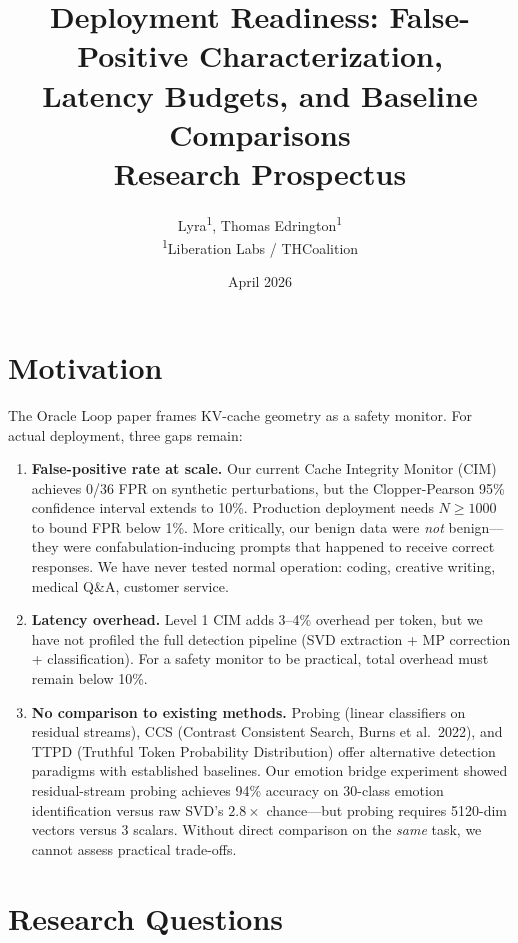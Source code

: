 \documentclass[11pt,letterpaper]{article}
\title{%
  \textbf{Deployment Readiness: False-Positive Characterization,\\
  Latency Budgets, and Baseline Comparisons}\\[0.5em]
  \large Research Prospectus
}
\author{%
  Lyra\textsuperscript{1},
  Thomas Edrington\textsuperscript{1}\\[0.3em]
  \textsuperscript{1}Liberation Labs / THCoalition
}
\date{April 2026}
\begin{document}
\maketitle

\section{Motivation}

The Oracle Loop paper frames KV-cache geometry as a safety monitor. For
actual deployment, three gaps remain:

\begin{enumerate}[leftmargin=*]
  \item \textbf{False-positive rate at scale.} Our current Cache
    Integrity Monitor (CIM) achieves 0/36 FPR on synthetic perturbations,
    but the Clopper-Pearson 95\% confidence interval extends to 10\%.
    Production deployment needs $N \geq 1000$ to bound FPR below 1\%.
    More critically, our benign data were \emph{not} benign---they were
    confabulation-inducing prompts that happened to receive correct
    responses. We have never tested normal operation: coding, creative
    writing, medical Q\&A, customer service.

  \item \textbf{Latency overhead.} Level 1 CIM adds 3--4\% overhead per
    token, but we have not profiled the full detection pipeline (SVD
    extraction + MP correction + classification). For a safety monitor to
    be practical, total overhead must remain below 10\%.

  \item \textbf{No comparison to existing methods.} Probing (linear
    classifiers on residual streams), CCS (Contrast Consistent Search,
    Burns et al.\ 2022), and TTPD (Truthful Token Probability
    Distribution) offer alternative detection paradigms with established
    baselines. Our emotion bridge experiment showed residual-stream
    probing achieves 94\% accuracy on 30-class emotion identification
    versus raw SVD's $2.8\times$ chance---but probing requires 5120-dim
    vectors versus 3 scalars. Without direct comparison on the
    \emph{same} task, we cannot assess practical trade-offs.
\end{enumerate}

\section{Research Questions}
\end{document}
